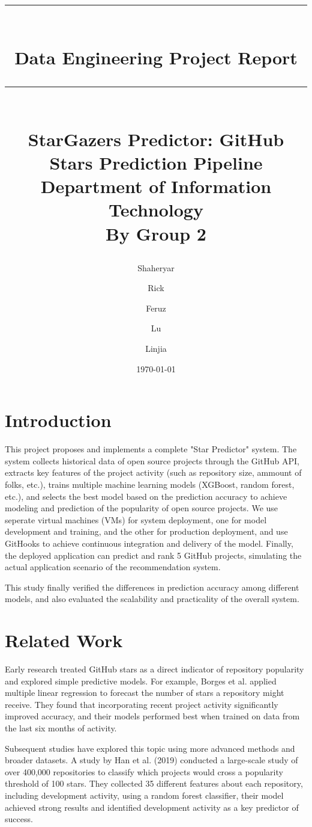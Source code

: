\documentclass[12pt,a4paper]{article}
\title{

    \rule{\textwidth}{4pt}\\[10pt]
    \huge \textbf{Data Engineering Project Report}
    \rule{\textwidth}{1pt}\\[15pt]
    
    \huge \color{darkgray}\textbf{StarGazers Predictor: GitHub Stars Prediction Pipeline}\\[15pt]
    
    \large \textbf{Department of Information Technology}\\[15pt]
    \large \textbf{By Group 2}\\[5pt]
}
\author{
    Shaheryar\\ 
    \and
    Rick\\
    \and
    Feruz\\
    \and
    Lu\\
    \and
    Linjia\\
    }
\date{\today} %
\begin{document}
\maketitle

\section{Introduction}
This project proposes and implements a complete "Star Predictor" system. The system collects historical data of open source projects through the GitHub API, extracts key features of the project activity (such as repository size, ammount of folks, etc.), trains multiple machine learning models (XGBoost, random forest, etc.), and selects the best model based on the prediction accuracy to achieve modeling and prediction of the popularity of open source projects. We use seperate virtual machines (VMs) for system deployment, one for model development and training, and the other for production deployment, and use GitHooks to achieve continuous integration and delivery of the model. Finally, the deployed application can predict and rank 5 GitHub projects, simulating the actual application scenario of the recommendation system.

This study finally verified the differences in prediction accuracy among different models, and also evaluated the scalability and practicality of the overall system.

\section{Related Work}
Early research treated GitHub stars as a direct indicator of repository popularity and explored simple predictive models. For example, Borges et al.\cite{3} applied multiple linear regression to forecast the number of stars a repository might receive. They found that incorporating recent project activity significantly improved accuracy, and their models performed best when trained on data from the last six months of activity. 

Subsequent studies have explored this topic using more advanced methods and broader datasets. A study by Han et al. (2019) conducted a large-scale study of over 400,000 repositories to classify which projects would cross a popularity threshold of 100 stars. They collected 35 different features about each repository, including development activity, using a random forest classifier, their model achieved strong results and identified development activity as a key predictor of success.\cite{1}  
\end{document}
